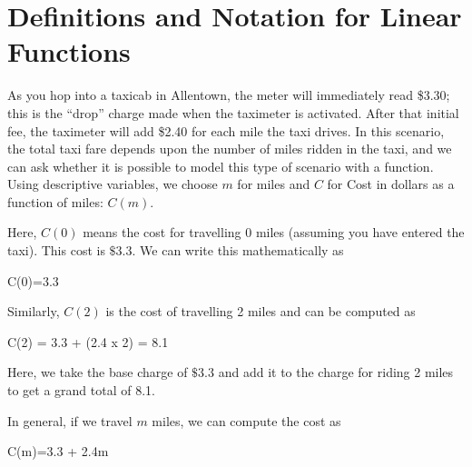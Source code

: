\documentclass[
  letterpaper,
  DIV=11,
  numbers=noendperiod]{scrreprt}
\newenvironment{Shaded}{\begin{snugshade}}{\end{snugshade}}
\newcommand{\DataTypeTok}[1]{\textcolor[rgb]{0.68,0.00,0.00}{#1}}
\newcommand{\ErrorTok}[1]{\textcolor[rgb]{0.68,0.00,0.00}{#1}}
\newcommand{\FloatTok}[1]{\textcolor[rgb]{0.68,0.00,0.00}{#1}}
\newcommand{\KeywordTok}[1]{\textcolor[rgb]{0.00,0.23,0.31}{#1}}
\newcommand{\OperatorTok}[1]{\textcolor[rgb]{0.37,0.37,0.37}{#1}}
\begin{document}
\hypertarget{definitions-and-notation-for-linear-functions}{%
\section{Definitions and Notation for Linear
Functions}\label{definitions-and-notation-for-linear-functions}}

As you hop into a taxicab in Allentown, the meter will immediately read
\$3.30; this is the ``drop'' charge made when the taximeter is
activated. After that initial fee, the taximeter will add \$2.40 for
each mile the taxi drives. In this scenario, the total taxi fare depends
upon the number of miles ridden in the taxi, and we can ask whether it
is possible to model this type of scenario with a function. Using
descriptive variables, we choose \(m\) for miles and \(C\) for Cost in
dollars as a function of miles: \(C(m)\).

Here, \(C(0)\) means the cost for travelling 0 miles (assuming you have
entered the taxi). This cost is \(\$3.3\). We can write this
mathematically as

\begin{Shaded}
\begin{Highlighting}[]
\DataTypeTok{C}\ErrorTok{(}\DataTypeTok{0}\ErrorTok{)}\OperatorTok{=}\FloatTok{3.3}
\end{Highlighting}
\end{Shaded}

Similarly, \(C(2)\) is the cost of travelling 2 miles and can be
computed as

\begin{Shaded}
\begin{Highlighting}[]
\DataTypeTok{C}\ErrorTok{(}\DataTypeTok{2}\ErrorTok{)} \OperatorTok{=} \FloatTok{3.3} \ErrorTok{+} \ErrorTok{(}\DataTypeTok{2}\KeywordTok{.}\DataTypeTok{4} \DataTypeTok{x} \DataTypeTok{2}\ErrorTok{)} \OperatorTok{=} \FloatTok{8.1}
\end{Highlighting}
\end{Shaded}

Here, we take the base charge of \(\$3.3\) and add it to the charge for
riding 2 miles to get a grand total of 8.1.

In general, if we travel \(m\) miles, we can compute the cost as

\begin{Shaded}
\begin{Highlighting}[]
\DataTypeTok{C}\ErrorTok{(}\DataTypeTok{m}\ErrorTok{)}\OperatorTok{=}\FloatTok{3.3} \ErrorTok{+} \DataTypeTok{2}\KeywordTok{.}\DataTypeTok{4m}
\end{Highlighting}
\end{Shaded}
\end{document}
